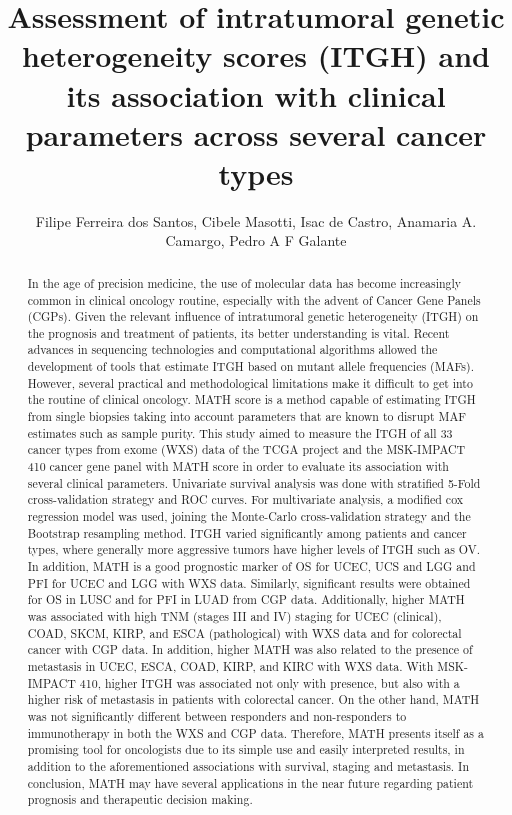 \documentclass[twoside]{article}
\title{\vspace{-15mm}\fontsize{24pt}{10pt}\selectfont\textbf{ Assessment of intratumoral genetic heterogeneity scores (ITGH) and its association with clinical parameters across several cancer types }} %
\author{ Filipe Ferreira dos Santos, Cibele Masotti, Isac de Castro, Anamaria A. Camargo, Pedro A F Galante }
\affil{ Molecular Oncology Center,  Hospital S\'{\i}rio-Liban\^es,  S\~ao Paulo,  Brazil }
\date{}
\begin{document}
  
  
  \maketitle %
  
  
  \thispagestyle{fancy} %
  
  
  \begin{abstract}
  In the age of precision medicine,  the use of molecular data has become increasingly common in clinical oncology routine,  especially with the advent of Cancer Gene Panels (CGPs). Given the relevant influence of intratumoral genetic heterogeneity (ITGH) on the prognosis and treatment of patients,  its better understanding is vital. Recent advances in sequencing technologies and computational algorithms allowed the development of tools that estimate ITGH based on mutant allele frequencies (MAFs). However,  several practical and methodological limitations make it difficult to get into the routine of clinical oncology. MATH score is a method capable of estimating ITGH from single biopsies taking into account parameters that are known to disrupt MAF estimates such as sample purity. This study aimed to measure the ITGH of all 33 cancer types from exome (WXS) data of the TCGA project and the MSK-IMPACT 410 cancer gene panel with MATH score in order to evaluate its association with several clinical parameters. Univariate survival analysis was done with stratified 5-Fold cross-validation strategy and ROC curves. For multivariate analysis,  a modified cox regression model was used,  joining the Monte-Carlo cross-validation strategy and the Bootstrap resampling method. ITGH varied significantly among patients and cancer types,  where generally more aggressive tumors have higher levels of ITGH such as OV. In addition,  MATH is a good prognostic marker of OS for UCEC,  UCS and LGG and PFI for UCEC and LGG with WXS data. Similarly,  significant results were obtained for OS in LUSC and for PFI in LUAD from CGP data. Additionally,  higher MATH was associated with high TNM (stages III and IV) staging for UCEC (clinical),  COAD,  SKCM,  KIRP,  and ESCA (pathological) with WXS data and for colorectal cancer with CGP data. In addition,  higher MATH was also related to the presence of metastasis in UCEC,  ESCA,  COAD,  KIRP,  and KIRC with WXS data. With MSK-IMPACT 410,  higher ITGH was associated not only with presence,  but also with a higher risk of metastasis in patients with colorectal cancer. On the other hand,  MATH was not significantly different between responders and non-responders to immunotherapy in both the WXS and CGP data. Therefore,  MATH presents itself as a promising tool for oncologists due to its simple use and easily interpreted results,  in addition to the aforementioned associations with survival,  staging and metastasis. In conclusion,  MATH may have several applications in the near future regarding patient prognosis and therapeutic decision making.
  

\end{abstract}
\end{document}
